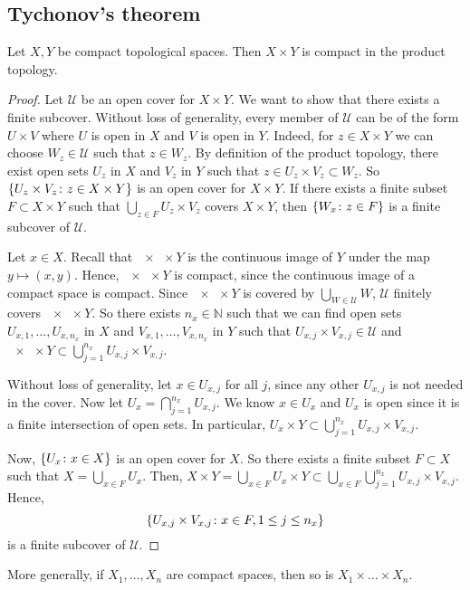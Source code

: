 \subsection{Tychonov's theorem}
\begin{theorem}
	Let \( X, Y \) be compact topological spaces.
	Then \( X \times Y \) is compact in the product topology.
\end{theorem}
\begin{proof}
	Let \( \mathcal U \) be an open cover for \( X \times Y \).
	We want to show that there exists a finite subcover.
	Without loss of generality, every member of \( \mathcal U \) can be of the form \( U \times V \) where \( U \) is open in \( X \) and \( V \) is open in \( Y \).
	Indeed, for \( z \in X \times Y \) we can choose \( W_z \in \mathcal U \) such that \( z \in W_z \).
	By definition of the product topology, there exist open sets \( U_z \) in \( X \) and \( V_z \) in \( Y \) such that \( z \in U_z \times V_z \subset W_z \).
	So \( \qty{U_z \times V_z \colon z \in X \times Y} \) is an open cover for \( X \times Y \).
	If there exists a finite subset \( F \subset X \times Y \) such that \( \bigcup_{z \in F} U_z \times V_z \) covers \( X \times Y \), then \( \qty{W_x \colon z \in F} \) is a finite subcover of \( \mathcal U \).

	Let \( x \in X \).
	Recall that \( \qty{x} \times Y \) is the continuous image of \( Y \) under the map \( y \mapsto (x,y) \).
	Hence, \( \qty{x} \times Y \) is compact, since the continuous image of a compact space is compact.
	Since \( \qty{x} \times Y \) is covered by \( \bigcup_{W \in \mathcal U} W \), \( \mathcal U \) finitely covers \( \qty{x} \times Y \).
	So there exists \( n_x \in \mathbb N \) such that we can find open sets \( U_{x,1}, \dots, U_{x,n_x} \) in \( X \) and \( V_{x,1}, \dots, V_{x, n_x} \) in \( Y \) such that \( U_{x,j} \times V_{x,j} \in \mathcal U \) and \( \qty{x} \times Y \subset \bigcup_{j=1}^{n_x} U_{x,j} \times V_{x,j} \).

	Without loss of generality, let \( x \in U_{x,j} \) for all \( j \), since any other \( U_{x,j} \) is not needed in the cover.
	Now let \( U_x = \bigcap_{j = 1}^{n_x} U_{x,j} \).
	We know \( x \in U_x \) and \( U_x \) is open since it is a finite intersection of open sets.
	In particular, \( U_x \times Y \subset \bigcup_{j=1}^{n_x} U_{x,j} \times V_{x,j} \).

	Now, \( \qty{U_x \colon x \in X} \) is an open cover for \( X \).
	So there exists a finite subset \( F \subset X \) such that \( X = \bigcup_{x \in F} U_x \).
	Then, \( X \times Y = \bigcup_{x \in F} U_x \times Y \subset \bigcup_{x \in F} \bigcup_{j = 1}^{n_x} U_{x,j} \times V_{x,j} \).
	Hence,
	\[
		\qty{U_{x,j} \times V_{x,j} \colon x \in F, 1 \leq j \leq n_x}
	\]
	is a finite subcover of \( \mathcal U \).
\end{proof}
\begin{remark}
	More generally, if \( X_1, \dots, X_n \) are compact spaces, then so is \( X_1 \times \dots \times X_n \).
\end{remark}


